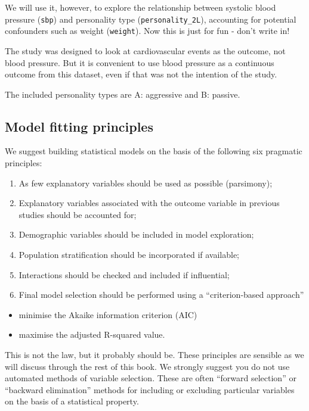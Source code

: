 \documentclass[
  12pt,
  krantz2]{krantz}
\providecommand{\tightlist}{%
  \setlength{\itemsep}{0pt}\setlength{\parskip}{0pt}}
\begin{document}
We will use it, however, to explore the relationship between systolic blood pressure (\texttt{sbp}) and personality type (\texttt{personality\_2L}), accounting for potential confounders such as weight (\texttt{weight}).
Now this is just for fun - don't write in!

The study was designed to look at cardiovascular events as the outcome, not blood pressure.
But it is convenient to use blood pressure as a continuous outcome from this dataset, even if that was not the intention of the study.

The included personality types are A: aggressive and B: passive.

\hypertarget{model-fitting-principles}{%
\subsection{Model fitting principles}\label{model-fitting-principles}}


We suggest building statistical models on the basis of the following six pragmatic principles:

\begin{enumerate}
\def\labelenumi{\arabic{enumi}.}
\tightlist
\item
  As few explanatory variables should be used as possible (parsimony);
\item
  Explanatory variables associated with the outcome variable in previous studies should be accounted for;
\item
  Demographic variables should be included in model exploration;
\item
  Population stratification should be incorporated if available;
\item
  Interactions should be checked and included if influential;
\item
  Final model selection should be performed using a ``criterion-based approach''
\end{enumerate}

\begin{itemize}
\tightlist
\item
  minimise the Akaike information criterion (AIC)
\item
  maximise the adjusted R-squared value.
\end{itemize}

This is not the law, but it probably should be.
These principles are sensible as we will discuss through the rest of this book.
We strongly suggest you do not use automated methods of variable selection.
These are often ``forward selection'' or ``backward elimination'' methods for including or excluding particular variables on the basis of a statistical property.
\end{document}
